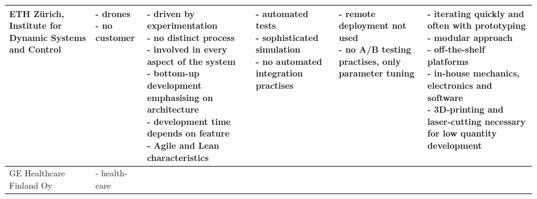 \documentclass[english]{tktltiki2}
\begin{document}
\begin{landscape}
\begin{longtable}{|p{2.5cm}|p{1.5cm}|p{4cm}|p{4cm}|p{4cm}|p{4cm}|}
        ETH Zürich, Institute for Dynamic Systems and Control &
        \parbox[t]{1.5cm}{- drones \\
                          - no customer} &
        \parbox[t]{4cm}{- driven by experimentation \\
                        - no distinct process \\
                        - involved in every aspect of the system \\
                        - bottom-up development emphasising on architecture \\
                        - development time depends on feature \\
                        - Agile and Lean characteristics} &
        \parbox[t]{4cm}{- automated tests \\
                        - sophisticated simulation \\
                        - no automated integration practises} &
        \parbox[t]{4cm}{- remote deployment not used \\
                        - no A/B testing practises, only parameter tuning} &
        \parbox[t]{4cm}{- iterating quickly and often with prototyping \\
                        - modular approach \\
                        - off-the-shelf platforms \\
                        - in-house mechanics, electronics and software \\
                        - 3D-printing and laser-cutting necessary for low quantity development} \\

        \hline

        GE Healthcare Finland Oy &
        \parbox[t]{1.5cm}{- health-care} &
        \parbox[t]{4cm}{} &
        \parbox[t]{4cm}{} &
        \parbox[t]{4cm}{} &
        \parbox[t]{4cm}{} \\

        \hline


\end{longtable}
\end{landscape}
\end{document}
